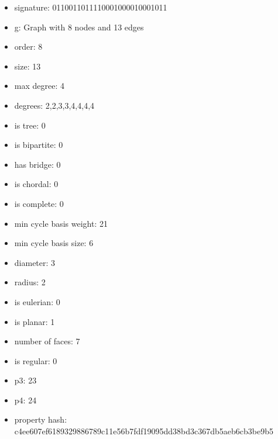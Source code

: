 \begin{itemize}
\item signature: 0110011011110001000010001011
\item g: Graph with 8 nodes and 13 edges
\item order: 8
\item size: 13
\item max degree: 4
\item degrees: 2,2,3,3,4,4,4,4
\item is tree: 0
\item is bipartite: 0
\item has bridge: 0
\item is chordal: 0
\item is complete: 0
\item min cycle basis weight: 21
\item min cycle basis size: 6
\item diameter: 3
\item radius: 2
\item is eulerian: 0
\item is planar: 1
\item number of faces: 7
\item is regular: 0
\item p3: 23
\item p4: 24
\item property hash: c4ee607ef6189329886789c11e56b7fdf19095dd38bd3c367db5aeb6cb3be9b5
\end{itemize}
\newpage
\begin{figure}
\end{figure}
